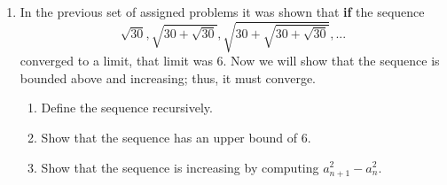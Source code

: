 \documentclass[12pt]{article}
\newif\ifans
\begin{document}
\begin{enumerate}
\item In the previous set of assigned problems it was shown that {\bf if} the sequence $$\sqrt{30}, \sqrt{30+\sqrt{30}}, \sqrt{30+\sqrt{30+\sqrt{30}}}, ... $$ converged to a limit, that limit was  $6$.  Now we will
show that the sequence is bounded above and increasing; thus, it must converge.

\begin{enumerate}

\item Define the sequence recursively.

\ifans{\fbox{$a_1=\sqrt{30}, a_{n+1}=\sqrt{30+a_n}$ for integers $n\geq1$.}} \fi

\item Show that the sequence has an upper bound of $6$.

\ifans{\fbox{\parbox{1\linewidth}{$a_1=\sqrt{30}<\sqrt{36}=6$, so $a_1<6$.
\\ $a_2=\sqrt{30+a_1}<\sqrt{30+6}=6$, so $a_2<6$.
\\ $a_3=\sqrt{30+a_2}<\sqrt{30+6}=6$, so $a_3<6$.
\\ This continues indefinitely, so $a_n<6$ for all integers $n\geq1$, i.e. the sequence is bounded from above by 6.  (It is also bounded from below by 0). }}} \fi

\item Show that the sequence is increasing by computing $a_{n+1}^2-a_n^2$.

\ifans{\fbox{\parbox{1\linewidth}{$a_{n+1}^2-a_n^2 = 30 + a_n - a_n^2 = (5+a_n)(6-a_n)$. 
\\ Now from part (b) $0<a_n<6$, so $5+a_n>0$ and $6-a_n>0$, so $a_{n+1}^2-a_n^2 > 0$.
\\ Also, $a_{n+1}^2-a_n^2=(a_{n+1}-a_n)(a_{n+1}+a_n)$, so $(a_{n+1}-a_n)(a_{n+1}+a_n) > 0$.
\\ Since every term in the sequence is positive, we now have $(a_{n+1}-a_n)>0$, or $a_{n+1}>a_n$, i.e. the sequence is (strictly) increasing.    }}} \fi

\end{enumerate}

\end{enumerate}
\end{document}
